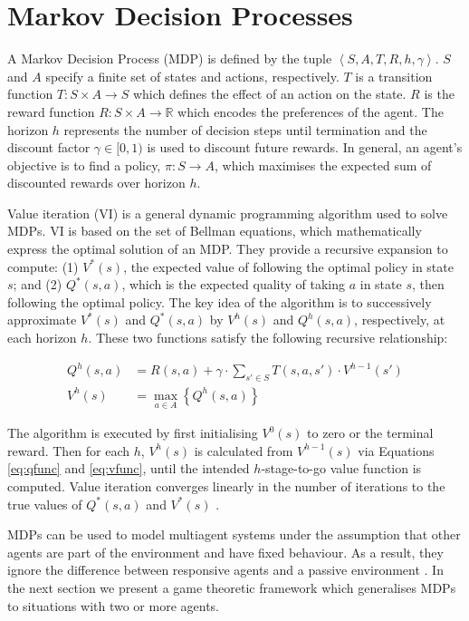 \section{Markov Decision Processes}
\label{sec:mdp}

A Markov Decision Process (MDP) \cite{Howard_1960} is defined by the tuple
$ \left\langle S, A, T, R, h, \gamma \right\rangle$. $S$ and $A$ 
specify a finite set of states and actions, respectively.
$T$ is a transition function $T : S \times A \rightarrow S$ which 
defines the effect of an action on the state. $R$ is the
reward function $R : S \times A \rightarrow \mathbb{R}$ which 
encodes the preferences of the agent. The horizon $h$ represents the 
number of decision steps until termination and the discount factor $\gamma \in [0, 1)$ 
is used to discount future rewards. In general, an agent's objective is 
to find a policy, $\pi : S \rightarrow A$, which maximises the expected 
sum of discounted rewards over horizon $h$.

Value iteration (VI) \cite{Bellman_1957} is a general dynamic programming 
algorithm used to solve MDPs. VI is based on the set of Bellman equations,
which mathematically express the optimal solution of an MDP. They 
provide a recursive expansion to compute: (1) $V^{*}(s)$, the expected value of following
the optimal policy in state $s$; and (2) $Q^{*}(s, a)$, which is the expected
quality of taking $a$ in state $s$, then following the optimal policy. The
key idea of the algorithm is to successively approximate $V^{*}(s)$ and $Q^{*}(s, a)$
by $V^{h}(s)$ and $Q^{h}(s, a)$, respectively, at each horizon $h$. These 
two functions satisfy the following recursive relationship:

{\small 
\abovedisplayskip=0pt
\belowdisplayskip=0pt
\begin{align}
  Q^{h}(s, a) &= R(s, a) + \gamma \cdot \sum_{s' \in S} T(s, a, s') \cdot V^{h-1}(s') \label{eq:qfunc}\\
  V^{h}(s) &= \max_{a \in A} \left\{ Q^{h}(s, a) \right\} \label{eq:vfunc}
\end{align}
}%

The algorithm is executed by first initialising $V^{0}(s)$  to zero or the terminal reward. 
Then for each $h$, $V^{h}(s)$ is calculated from $V^{h-1}(s)$ via
Equations \eqref{eq:qfunc} and \eqref{eq:vfunc}, until the intended 
$h$-stage-to-go value function is computed. Value iteration converges 
linearly in the number of iterations to the true values of $Q^{*}(s, a)$ and $V^{*}(s)$ 
\cite{Bertsekas_1987}.

MDPs can be used to model multiagent systems under the assumption 
that other agents are part of the environment and have fixed behaviour. 
As a result, they ignore the difference between responsive agents and 
a passive environment \cite{Hu_ICML_1998}. In the next section we 
present a game theoretic framework which generalises MDPs to 
situations with two or more agents.